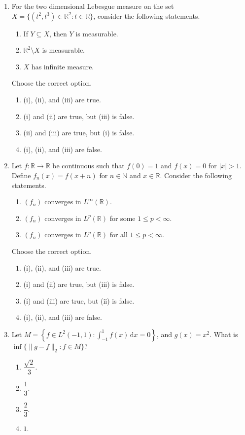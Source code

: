 \documentclass[11pt, a4paper]{article}
\begin{document}
\begin{enumerate}
\item For the two dimensional Lebesgue measure on the set $X=\{(t^2,t^3)\in\mathbb{R}^2:t\in\mathbb{R}\}$, consider the following statements.
\begin{enumerate}[label=(\roman*)]
\item If $Y\subseteq X$, then $Y$ is measurable.
\item $\mathbb{R}^2\setminus X$ is measurable.
\item $X$ has infinite measure.
\end{enumerate}
Choose the correct option.
\begin{enumerate}[label=(\alph*)]
\item (i), (ii), and (iii) are true.
\item (i) and (ii) are true, but (iii) is false.
\item (ii) and (iii) are true, but (i) is false.
\item (i), (ii), and (iii) are false.
\end{enumerate}

\item Let $f:\mathbb{R}\to\mathbb{R}$ be continuous such that $f(0)=1$ and $f(x)=0$ for $|x|>1$. Define $f_n(x)=f(x+n)$ for $n\in\mathbb{N}$ and $x\in\mathbb{R}$. Consider the following statements.
\begin{enumerate}[label=(\roman*)]
\item $(f_n)$ converges in $L^\infty(\mathbb{R})$.
\item $(f_n)$ converges in $L^p(\mathbb{R})$ for some $1\le p<\infty$.
\item $(f_n)$ converges in $L^p(\mathbb{R})$ for all $1\le p<\infty$.
\end{enumerate}
Choose the correct option.
\begin{enumerate}[label=(\alph*)]
\item (i), (ii), and (iii) are true.
\item (i) and (ii) are true, but (iii) is false.
\item (i) and (iii) are true, but (ii) is false.
\item (i), (ii), and (iii) are false.
\end{enumerate}

\item Let $M=\left\{f\in L^2(-1,1):\int_{-1}^1 f(x)\,\mathrm{d} x=0\right\}$, and $g(x)=x^2$. What is $\inf\{\|g-f\|_2: f\in M\}$?
\begin{enumerate}[label=(\alph*)]
\item $\dfrac{\sqrt2}{3}$. \item $\dfrac13$. \item $\dfrac23$. \item $1$.
\end{enumerate}


\end{enumerate}
\end{document}

